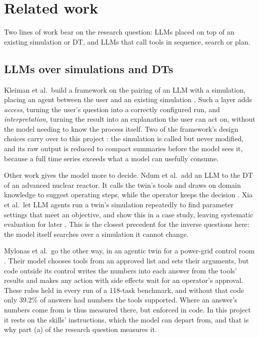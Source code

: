 
  \section{Related work}
  \label{sec:related}

  Two lines of work bear on the research question: LLMs placed on top of an existing
  simulation or DT, and LLMs that call tools in sequence, search or plan.

  \subsection{LLMs over simulations and DTs}
  \label{sec:related-dt}

  Kleiman et al.\ build a framework on the pairing of an LLM with a simulation, placing an agent between the user
  and an existing simulation \cite{kleiman2025simulationagent}. Such a layer adds \emph{access},
  turning the user's question into a correctly configured run, and \emph{interpretation}, turning
  the result into an explanation the user can act on, without the model needing to know the
  process itself. Two of the framework's design choices carry over to this project
  \cite{kleiman2025simulationagent}: the simulation is called but never modified, and its raw
  output is reduced to compact summaries before the model sees it, because a full time series
  exceeds what a model can usefully consume.

  Other work gives the model more to decide. Ndum et al.\ add an LLM to the DT
  of an advanced nuclear reactor. It calls the twin's tools and draws on domain knowledge to
  suggest operating steps, while the operator keeps the decision \cite{ndum2026aroma}. Xia et al.\
  let LLM agents run a twin's simulation repeatedly to find parameter settings that
  meet an objective, and show this in a case study, leaving systematic evaluation for later
  \cite{xia2024llmsimulation}. This is the closest precedent for the inverse questions here: the
  model itself searches over a simulation it cannot change.

  Mylonas et al.\ go the other way, in an agentic twin for a power-grid control room
  \cite{mylonas2026governance}. Their model chooses tools from an approved list and sets their
  arguments, but code outside its control writes the numbers into each answer from the tools'
  results and makes any action with side effects wait for an operator's approval. These rules
  held in every run of a 118-task benchmark, and without that code only 39.2\% of answers had
  numbers the tools supported. Where an answer's numbers come from is thus
  measured there, but enforced in code. In this project it rests on the skills' instructions,
  which the model can depart from, and that is why part (a) of the research question measures it.

